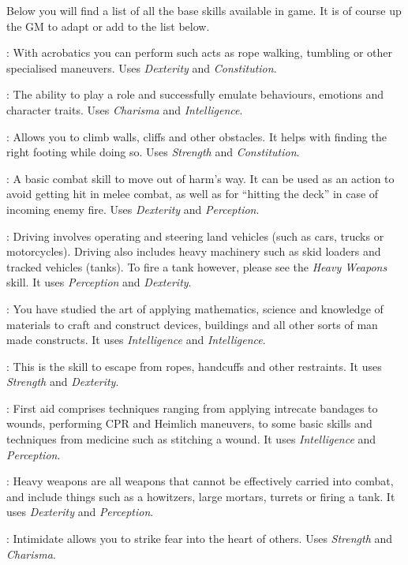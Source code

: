 Below you will find a list of all the base skills available in game. It is of
course up the GM to adapt or add to the list below.

: With acrobatics you can perform such acts as rope walking,
tumbling or other specialised maneuvers. Uses \emph{Dexterity} and
\emph{Constitution}.

: The ability to play a role and successfully emulate behaviours,
emotions and character traits. Uses \emph{Charisma} and \emph{Intelligence}.

: Allows you to climb walls, cliffs and other obstacles. It helps
with finding the right footing while doing so. Uses \emph{Strength} and
\emph{Constitution}.

: A basic combat skill to move out of harm's way. It can be used
as an action to avoid getting hit in melee combat, as well as for ``hitting the
deck'' in case of incoming enemy fire. Uses \emph{Dexterity} and
\emph{Perception}.

: Driving involves operating and steering land vehicles (such as
cars, trucks or motorcycles). Driving also includes heavy machinery such as
skid loaders and tracked vehicles (tanks). To fire a tank however, please see
the \emph{Heavy Weapons} skill. It uses \emph{Perception} and \emph{Dexterity}.

: You have studied the art of applying mathematics,
science and knowledge of materials to craft and construct devices, buildings and
all other sorts of man made constructs. It uses \emph{Intelligence} and
\emph{Intelligence}.

: This is the skill to escape from ropes, handcuffs and
other restraints. It uses \emph{Strength} and \emph{Dexterity}.

: First aid comprises techniques ranging from applying intrecate
bandages to wounds, performing CPR and Heimlich maneuvers, to some basic skills
and techniques from medicine such as stitching a wound. It uses
\emph{Intelligence} and \emph{Perception}.

: Heavy weapons are all weapons that cannot be effectively
carried into combat, and include things such as a howitzers, large mortars,
turrets or firing a tank. It uses \emph{Dexterity} and \emph{Perception}.

: Intimidate allows you to strike fear into the heart of
others. Uses \emph{Strength} and \emph{Charisma}.


